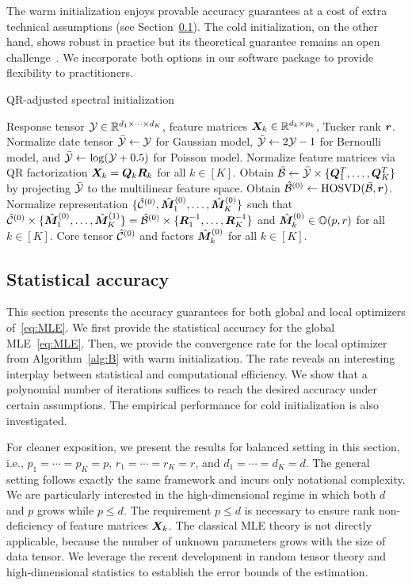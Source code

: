 \documentclass[12pt]{article}
\theoremstyle{definition}
\theoremstyle{definition}
\begin{document}
{  The warm initialization enjoys provable accuracy guarantees at a cost of extra technical assumptions (see Section~\ref{subsec:statprob}). The cold initialization, on the other hand, shows robust in practice but its theoretical guarantee remains an open challenge~\citep{luo2021low}. We incorporate both options in our software package to provide flexibility to practitioners.}


\begin{algorithm}[!h]
\caption{QR-adjusted spectral initialization}\label{alg:A}
\begin{algorithmic}[1]
\INPUT Response tensor $\mathcal{Y}\in \mathbb{R}^{d_1\times \cdots \times d_K}$, feature matrices $\bm X_k\in\mathbb{R}^{d_k\times p_k}$, Tucker rank $\bm{r}$. 
\State Normalize date tensor $\bar {\mathcal{Y}}\leftarrow \mathcal{Y}$ for Gaussian model, $\bar {\mathcal{Y}}\leftarrow 2\mathcal{Y}-1$ for Bernoulli model, and $\bar {\mathcal{Y}}\leftarrow \log(\mathcal{Y}+0.5)$ for Poisson model. 
\State Normalize feature matrices via QR factorization $\bm X_k=\bm{Q}_k\bm{R}_k$ for all $k\in[K]$.
\State Obtain $\bar {\mathcal{B}} \leftarrow \bar {\mathcal{Y}}\times\{\bm{Q}^T_1,\ldots,\bm{Q}^T_K\}$ by projecting $\bar {\mathcal{Y}}$ to the multilinear feature space. 
\State Obtain $\hat{\mathcal{B}}^{(0)}\leftarrow \textup{HOSVD}(\bar {\mathcal{B}},\bm{r})$.
\State Normalize representation $\{\hat{\mathcal{C}}^{(0)}, \hat{\bm M}^{(0)}_1,\ldots,\hat{\bm M}^{(0)}_K\}$ such that $\hat{\mathcal{C}}^{(0)}\times\{ \hat{\bm M}^{(0)}_1,\ldots,\hat{\bm M}^{(1)}_K\} = \hat{\mathcal{B}}^{(0)}\times\{ \bm{R}^{-1}_1,\ldots,\bm{R}^{-1}_K\}$ and $\hat{\bm M}^{(0)}_k\in\mathbb{O}(p,r)$ for all $k\in[K]$.
\OUTPUT Core tensor $\hat{\mathcal{C}}^{(0)}$ and factors $\hat{\bm M}^{(0)}_k$ for all $k\in[K]$.
\end{algorithmic}
\end{algorithm}

\subsection{Statistical accuracy}\label{subsec:statprob}
{  This section presents the accuracy guarantees for both global and local optimizers of~\eqref{eq:MLE}. We first provide the statistical accuracy for the global MLE~\eqref{eq:MLE}. Then, we provide the convergence rate for the local optimizer from Algorithm~\ref{alg:B} with warm initialization. The rate reveals an interesting interplay between statistical and computational efficiency. We show that a polynomial number of iterations suffices to reach the desired accuracy under certain assumptions.} The empirical performance for cold initialization is also investigated. 

For cleaner exposition, we present the results for balanced setting in this section, i.e., $p_1=\cdots=p_K=p$, $r_1=\cdots=r_K=r$, and $d_1=\cdots=d_K=d$. The general setting follows exactly the same framework and incurs only notational complexity. We are particularly interested in the high-dimensional regime in which both $d$ and $p$ grows while $p\leq d$. {  The requirement $p\leq d$ is necessary to ensure rank non-deficiency of  feature matrices $\bm X_k$.} The classical MLE theory is not directly applicable, because the number of unknown parameters grows with the size of data tensor. We leverage the recent development in random tensor theory and high-dimensional statistics to establish the error bounds of the estimation. 
\end{document}
